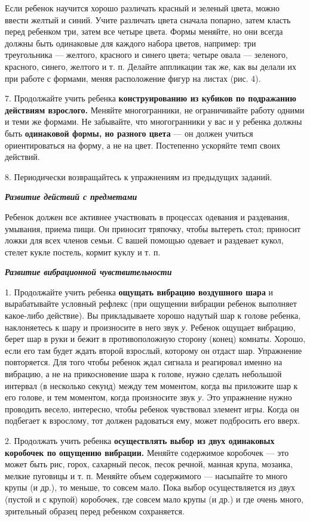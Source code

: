 \documentclass[a5paper]{book}
\renewcommand{\emph}[1]{\textit{#1}}
\begin{document}
Если ребенок научится хорошо различать красный и зеленый цвета, можно
ввести желтый и синий. Учите различать цвета сначала попарно, затем
класть перед ребенком три, затем все четыре цвета. Формы меняйте, но они
всегда должны быть одинаковые для каждого набора цветов, например: три
треугольника --- желтого, красного и синего цвета; четыре овала ---
зеленого, красного, синего, желтого и т. п. Делайте аппликации так же,
как вы делали их при работе с формами, меняя расположение фигур на
листах (рис. 4).

7. Продолжайте учить ребенка \textbf{конструированию из кубиков по
подражанию действиям взрослого.} Меняйте многогранники, не ограничивайте
работу одними и теми же формами. Не забывайте, что многогранники у вас и
у ребенка должны быть \textbf{одинаковой формы, но разного цвета} --- он
должен учиться ориентироваться на форму, а не на цвет. Постепенно
ускоряйте темп своих действий.

8. Периодически возвращайтесь к упражнениям из предыдущих заданий.

\emph{\textbf{Развитие действий с предметами}}

Ребенок должен все активнее участвовать в процессах одевания и
раздевания, умывания, приема пищи. Он приносит тряпочку, чтобы вытереть
стол; приносит ложки для всех членов семьи. С вашей помощью одевает и
раздевает кукол, стелет кукле постель, кормит куклу и т. п.

\emph{\textbf{Развитие вибрационной чувствительности}}

1. Продолжайте учить ребенка \textbf{ощущать вибрацию воздушного шара} и
вырабатывайте условный рефлекс (при ощущении вибрации ребенок выполняет
какое-либо действие). Вы прикладываете хорошо надутый шар к голове
ребенка, наклоняетесь к шару и произносите в него звук \emph{у.} Ребенок
ощущает вибрацию, берет шар в руки и бежит в противоположную сторону
(конец) комнаты. Хорошо, если его там будет ждать второй взрослый,
которому он отдаст шар. Упражнение повторяется. Для того чтобы ребенок
ждал сигнала и реагировал именно на вибрацию, а не на прикосновение шара
к голове, нужно сделать небольшой интервал (в несколько секунд) между
тем моментом, когда вы приложите шар к его голове, и тем моментом, когда
произносите звук \emph{у.} Это упражнение нужно проводить весело,
интересно, чтобы ребенок чувствовал элемент игры. Когда он подбегает к
взрослому, тот должен радоваться ему, может подбросить его вверх.

2. Продолжать учить ребенка \textbf{осуществлять выбор из двух
одинаковых коробочек по ощущению вибрации.} Меняйте содержимое коробочек
--- это может быть рис, горох, сахарный песок, песок речной, манная
крупа, мозаика, мелкие пуговицы и т. п. Меняйте объем содержимого ---
насыпайте то много крупы (и др.), то меньше, то совсем мало. Пока выбор
осуществляется из двух (пустой и с крупой) коробочек, где совсем мало
крупы (и др.) и где очень много, зрительный образец перед ребенком
сохраняется.
\end{document}
